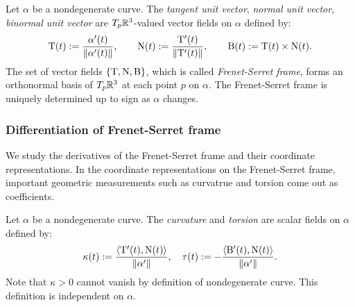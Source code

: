 \documentclass{../exp}
\def\a{\alpha}
\begin{document}
\begin{defn}
Let $\a$ be a nondegenerate curve.
The \emph{tangent unit vector}, \emph{normal unit vector}, \emph{binormal unit vector} are $T_p\mathbb{R}^3$-valued vector fields on $\a$ defined by:
\[\rT(t):=\frac{\a'(t)}{\|\a'(t)\|},\qquad\rN(t):=\frac{\rT'(t)}{\|\rT'(t)\|},\qquad\rB(t):=\rT(t)\times\rN(t).\]
The set of vector fields $\{\mathrm{T},\mathrm{N},\mathrm{B}\}$, which is called \emph{Frenet-Serret frame}, forms an orthonormal basis of $T_p\mathbb{R}^3$ at each point $p$ on $\a$.
The Frenet-Serret frame is uniquely determined up to sign as $\a$ changes.
\end{defn}



\subsubsection{Differentiation of Frenet-Serret frame}

We study the derivatives of the Frenet-Serret frame and their coordinate representations.
In the coordinate representations on the Frenet-Serret frame, important geometric measurements such as curvatrue and torsion come out as coefficients.

\begin{defn}
Let $\a$ be a nondegenerate curve.
The \emph{curvature} and \emph{torsion} are scalar fields on $\a$ defined by:
\[\kappa(t):=\frac{\<\rT'(t),\rN(t)\>}{\|\a'\|},\quad\tau(t):=-\frac{\<\rB'(t),\rN(t)\>}{\|\a'\|}.\]
Note that $\kappa>0$ cannot vanish by definition of nondegenerate curve.
This definition is independent on $\a$.
\end{defn}
\end{document}
